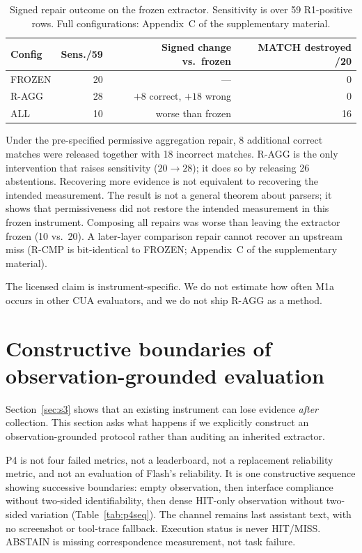 \documentclass[sigconf,anonymous]{aamas}
\begin{document}
\begin{table}[H]
\centering
\caption{Signed repair outcome on the frozen extractor. Sensitivity is over 59 R1-positive rows. Full configurations: Appendix~C of the supplementary material.}
\label{tab:repairs}
\footnotesize
\setlength{\tabcolsep}{3pt}
\begin{tabular}{lrrr}
\toprule
Config & Sens./59 & Signed change vs.\ frozen & MATCH destroyed /20 \\
\midrule
FROZEN & 20 & --- & 0 \\
R-AGG  & 28 & $+8$ correct, $+18$ wrong & 0 \\
ALL    & 10 & worse than frozen & 16 \\
\bottomrule
\end{tabular}
\end{table}

Under the pre-specified permissive aggregation repair, 8 additional correct matches were released together with 18 incorrect matches.
R-AGG is the only intervention that raises sensitivity ($20\to 28$); it does so by releasing 26 abstentions.
Recovering more evidence is not equivalent to recovering the intended measurement.
The result is not a general theorem about parsers; it shows that permissiveness did not restore the intended measurement in this frozen instrument.
Composing all repairs was worse than leaving the extractor frozen (10 vs.\ 20).
A later-layer comparison repair cannot recover an upstream miss (R-CMP is bit-identical to FROZEN; Appendix~C of the supplementary material).

The licensed claim is instrument-specific.
We do not estimate how often M1a occurs in other CUA evaluators, and we do not ship R-AGG as a method.

\section{Constructive boundaries of observation-grounded evaluation}
\label{sec:p4}

Section~\ref{sec:s3} shows that an existing instrument can lose evidence \emph{after} collection.
This section asks what happens if we explicitly construct an observation-grounded protocol rather than auditing an inherited extractor.

P4 is not four failed metrics, not a leaderboard, not a replacement reliability metric, and not an evaluation of Flash's reliability.
It is one constructive sequence showing successive boundaries: empty observation, then interface compliance without two-sided identifiability, then dense HIT-only observation without two-sided variation (Table~\ref{tab:p4seq}).
The channel remains last assistant text, with no screenshot or tool-trace fallback.
Execution status is never HIT/MISS.
ABSTAIN is missing correspondence measurement, not task failure.
\end{document}
